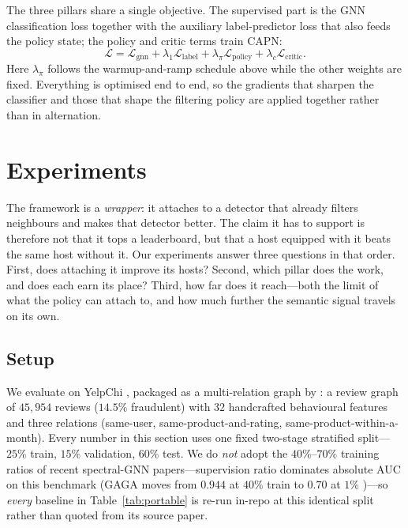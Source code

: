 \documentclass{conf}
\begin{document}
The three pillars share a single objective. The supervised part is the GNN
classification loss together with the auxiliary label-predictor loss that also
feeds the policy state; the policy and critic terms train CAPN:
\begin{equation}
\label{eq:loss}
\mathcal{L} = \mathcal{L}_{\text{gnn}}
+ \lambda_1 \mathcal{L}_{\text{label}}
+ \lambda_\pi \mathcal{L}_{\text{policy}}
+ \lambda_c \mathcal{L}_{\text{critic}} .
\end{equation}
Here $\lambda_\pi$ follows the warmup-and-ramp schedule above while the other
weights are fixed. Everything is optimised end to end, so the gradients that
sharpen the classifier and those that shape the filtering policy are applied
together rather than in alternation.


\section{Experiments}
\label{sec:results}

The framework is a \emph{wrapper}: it attaches to a detector that already
filters neighbours and makes that detector better. The claim it has to support
is therefore not that it tops a leaderboard, but that a host equipped with it
beats the same host without it. Our experiments answer three questions in that
order. First, does attaching it improve its hosts? Second, which pillar does
the work, and does each earn its place? Third, how far does it reach---both the
limit of what the policy can attach to, and how much further the semantic
signal travels on its own.

\subsection{Setup}

We evaluate on YelpChi \cite{rayana2015collective}, packaged as a multi-relation
graph by \cite{dou2020enhancing}: a review graph of
$45{,}954$ reviews ($14.5\%$ fraudulent) with $32$ handcrafted behavioural
features and three relations (same-user, same-product-and-rating,
same-product-within-a-month). Every number in this section uses one fixed
two-stage stratified split---$25\%$ train, $15\%$ validation, $60\%$
test. We do \emph{not} adopt the $40\%$--$70\%$ training
ratios of recent spectral-GNN papers---supervision ratio dominates absolute AUC
on this benchmark (GAGA moves from $0.944$ at $40\%$ train to $0.70$ at
$1\%$ \cite{wang2023gaga})---so \emph{every} baseline in
Table~\ref{tab:portable} is re-run in-repo at this identical split rather than
quoted from its source paper.
\end{document}
